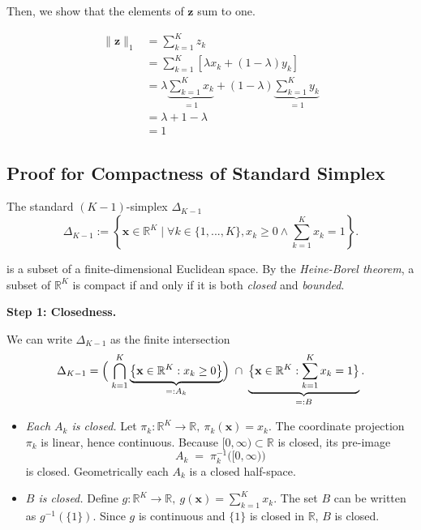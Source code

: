 \documentclass[oneside]{article}
\begin{document}
Then, we show that the elements of $\mathbf{z}$ sum to one.

$$
\begin{aligned}
\| \mathbf{z} \|_1 &= \sum_{k=1}^K z_k \\
&= \sum_{k=1}^K \left[ \lambda x_k + (1-\lambda) y_k \right] \\
&= \lambda \underbrace{\sum_{k=1}^K x_k}_{=1} + (1-\lambda) \underbrace{\sum_{k=1}^K y_k}_{=1} \\
&= \lambda + 1 - \lambda \\
&= 1
\end{aligned}
$$

\subsection{Proof for Compactness of Standard Simplex}
\label{subsec:compactness_simplex}

The standard $(K-1)$-simplex $\Delta_{K-1}$
\begin{equation}
    \Delta_{K-1} := \left\{ \mathbf{x} \in \mathbb{R}^{K} \mid \forall k \in \{1, ..., K \}, x_k \geq 0 \land \sum_{k=1}^{K} x_k = 1 \right\}.
\end{equation}

is a subset of a finite-dimensional Euclidean space. By the \emph{Heine-Borel theorem}, a subset of $\mathbb R^{K}$ is compact if and only if it is both \emph{closed} and \emph{bounded}.

\textbf{Step 1: Closedness.}

We can write $\Delta_{K-1}$  as the finite intersection
\begin{equation}
   \Delta_{K-1} = \Bigl(\;\bigcap_{k=1}^{K}
          \underbrace{\bigl\{\mathbf x\in\mathbb R^{K}:x_k\ge 0\bigr\}}_{=:A_k}
        \Bigr)
   \;\cap\;
   \underbrace{\bigl\{\mathbf x\in\mathbb R^{K}:\sum_{k=1}^{K}x_k=1\bigr\}}_{=:B}.
\end{equation}

\begin{itemize}
\item\emph{Each $A_k$ is closed.}
      Let $\pi_k:\mathbb R^{K}\to\mathbb R,\ \pi_k(\mathbf x)=x_k$.
      The coordinate projection $\pi_k$ is linear, hence continuous.
      Because $[0,\infty)\subset\mathbb R$ is closed, its pre-image
      \begin{equation}
        A_k \;=\; \pi_k^{-1}\bigl([0,\infty)\bigr)
      \end{equation}
      is closed. Geometrically each $A_k$ is a closed half-space.

\item\emph{$B$ is closed.}
      Define $g:\mathbb R^{K}\to\mathbb R,\ g(\mathbf x)=\sum_{k=1}^{K}x_k$.
      The set $B$ can be written as $g^{-1}(\{1\})$.
      Since $g$ is continuous and $\{1\}$ is closed in $\mathbb R$, $B$ is closed.
\end{itemize}
\end{document}
